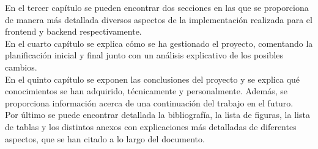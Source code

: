 En el tercer capítulo se pueden encontrar dos secciones en las que se proporciona de manera más detallada diversos aspectos de la implementación realizada para el frontend y backend respectivamente.\\

En el cuarto capítulo se explica cómo se ha gestionado el proyecto, comentando la planificación inicial y final junto con un análisis explicativo de los posibles cambios.\\

En el quinto capítulo se exponen las conclusiones del proyecto y se explica qué conocimientos se han adquirido, técnicamente y personalmente. Además, se proporciona información acerca de una continuación del trabajo en el futuro.\\

Por último se puede encontrar detallada la bibliografía, la lista de figuras, la lista de tablas y los distintos anexos con explicaciones más detalladas de diferentes aspectos, que se han citado a lo largo del documento.








